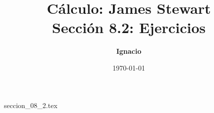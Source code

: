 \documentclass[11pt,spanish,oneside]{report}
\title{\textbf{Cálculo: James Stewart} \\ \Large Sección 8.2: Ejercicios}
\author{\textbf{Ignacio}}
\date{\today}
\begin{document}
\maketitle

{seccion_08_2.tex}
\end{document}
